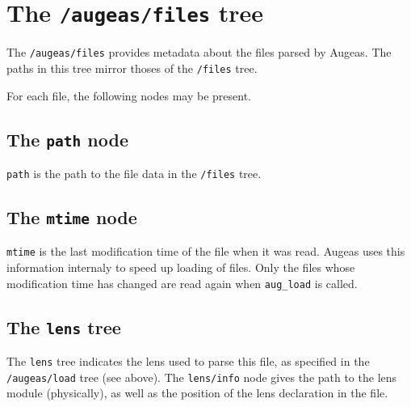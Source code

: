    


\begin{quote}

\end{quote}
\section{The \texttt{/augeas/files} tree}


The \nolinkurl{/augeas/files} provides metadata about the files parsed by Augeas. The paths in this tree mirror thoses of the \nolinkurl{/files} tree.

For each file, the following nodes may be present.

\subsection{The \texttt{path} node}

\verb!path! is the path to the file data in the \nolinkurl{/files} tree.

\subsection{The \texttt{mtime} node}

\verb!mtime! is the last modification time of the file when it was read. Augeas uses this information internaly to speed up loading of files. Only the files whose modification time has changed are read again when \verb!aug_load! is called.

\subsection{The \texttt{lens} tree}

The \verb!lens! tree indicates the lens used to parse this file, as specified in the \nolinkurl{/augeas/load} tree (see above). The \verb!lens/info! node gives the path to the lens module (physically), as well as the position of the lens declaration in the file.

